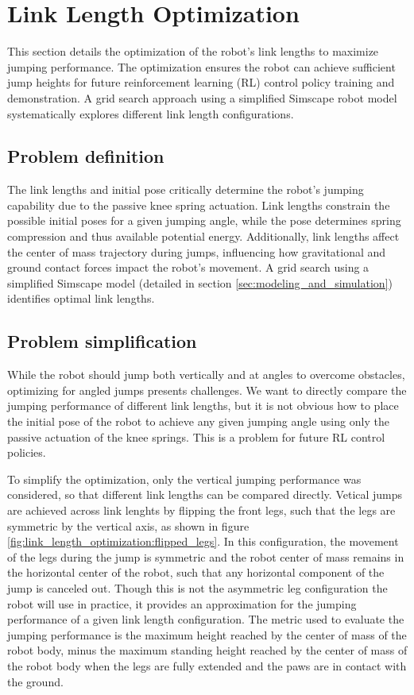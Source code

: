 \section{Link Length Optimization}
\label{sec:link_length_optimization}
This section details the optimization of the robot's link lengths to maximize jumping performance. The optimization ensures the robot can achieve sufficient jump heights for future reinforcement learning (RL) control policy training and demonstration. A grid search approach using a simplified Simscape robot model systematically explores different link length configurations.

\subsection{Problem definition}
The link lengths and initial pose critically determine the robot's jumping capability due to the passive knee spring actuation. Link lengths constrain the possible initial poses for a given jumping angle, while the pose determines spring compression and thus available potential energy. Additionally, link lengths affect the center of mass trajectory during jumps, influencing how gravitational and ground contact forces impact the robot's movement. A grid search using a simplified Simscape model (detailed in section \ref{sec:modeling_and_simulation}) identifies optimal link lengths.

\subsection{Problem simplification}

While the robot should jump both vertically and at angles to overcome obstacles, optimizing for angled jumps presents challenges. We want to directly compare the jumping performance of different link lengths, but it is not obvious how to place the initial pose of the robot to achieve any given jumping angle using only the passive actuation of the knee springs. This is a problem for future RL control policies.


To simplify the optimization, only the vertical jumping performance was considered, so that different link lengths can be compared directly. Vetical jumps are achieved across link lenghts by flipping the front legs, such that the legs are symmetric by the vertical axis, as shown in figure \ref{fig:link_length_optimization:flipped_legs}. In this configuration, the movement of the legs during the jump is symmetric and the robot center of mass remains in the horizontal center of the robot, such that any horizontal component of the jump is canceled out. Though this is not the asymmetric leg configuration the robot will use in practice, it provides an approximation for the jumping performance of a given link length configuration. The metric used to evaluate the jumping performance is the maximum height reached by the center of mass of the robot body, minus the maximum standing height reached by the center of mass of the robot body when the legs are fully extended and the paws are in contact with the ground.

